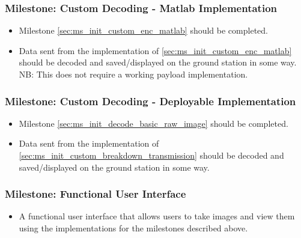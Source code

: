 	\subsubsection{Milestone: Custom Decoding - Matlab Implementation}
		\begin{itemize}
			\item 	Milestone \ref{sec:ms_init_custom_enc_matlab} should be completed.
			\item 	Data sent from the implementation of \ref{sec:ms_init_custom_enc_matlab} should be
				decoded and saved/displayed on the ground station in some way. NB: This does not require
				a working payload implementation.
		\end{itemize}

	\subsubsection{Milestone: Custom Decoding - Deployable Implementation}
		\begin{itemize}
			\item 	Milestone \ref{sec:ms_init_decode_basic_raw_image} should be completed.
			\item 	Data sent from the implementation of \ref{sec:ms_init_custom_breakdown_transmission} should be
				decoded and saved/displayed on the ground station in some way.
		\end{itemize}

	\subsubsection{Milestone: Functional User Interface}
		\begin{itemize}
			\item 	A functional user interface that allows users to take images and view them using the implementations
				for the milestones described above.
		\end{itemize}

